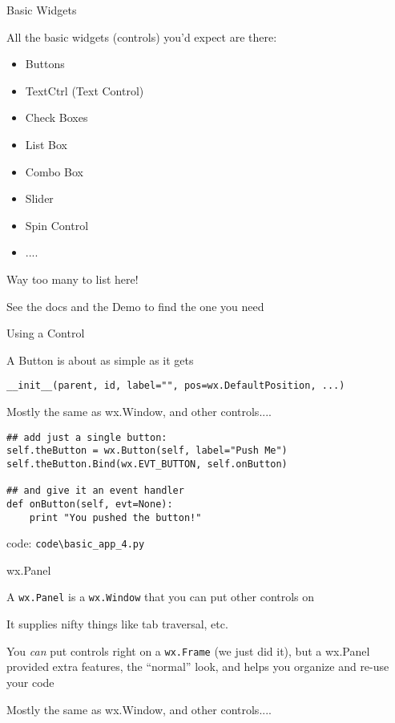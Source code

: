 \documentclass{beamer}
\begin{document}
\begin{frame}[fragile]{Basic Widgets}

\vfill
{\Large All the basic widgets (controls) you'd expect are there:}

\begin{itemize}
 \item Buttons
 \item TextCtrl (Text Control)
 \item Check Boxes
 \item List Box
 \item Combo Box
 \item Slider
 \item Spin Control
 \item ....
\end{itemize}

\vfill
{\Large Way too many to list here!}

\vfill
{\Large See the docs and the Demo to find the one you need}

\end{frame}

\begin{frame}[fragile]{Using a Control}

{\Large A Button is about as simple as it gets}

\vfill
{\verb`__init__(parent, id, label="", pos=wx.DefaultPosition, ...)` }

\vfill
{\Large Mostly the same as wx.Window, and other controls....}

\begin{verbatim}
## add just a single button:
self.theButton = wx.Button(self, label="Push Me")
self.theButton.Bind(wx.EVT_BUTTON, self.onButton)
 
## and give it an event handler                                  
def onButton(self, evt=None):
    print "You pushed the button!"
\end{verbatim}

\vfill
code: \verb`code\basic_app_4.py`
\end{frame}

\begin{frame}[fragile]{wx.Panel}

{\Large A \verb`wx.Panel` is a \verb`wx.Window` that you can put other controls on}

\vfill
{\Large It supplies nifty things like tab traversal, etc.}

\vfill
{\Large You \emph{can} put controls right on a \verb`wx.Frame` (we just did it), but a wx.Panel provided extra features, the ``normal'' look, and helps you organize and re-use your code}

\vfill
{\Large Mostly the same as wx.Window, and other controls....}

\end{frame}
\end{document}
